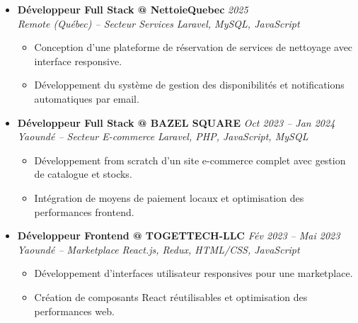 \documentclass[a4paper,11pt]{article}
\begin{document}
\begin{itemize}[leftmargin=*, label={-}]
\item \textbf{Développeur Full Stack @ NettoieQuebec} \hfill \textit{2025} \\
\textit{Remote (Québec) -- Secteur Services} \hfill \textit{Laravel, MySQL, JavaScript}
\vspace{-2pt}
    \begin{itemize}[leftmargin=0.4cm, nosep, label=\tiny$\bullet$]
        \item \small{Conception d'une plateforme de réservation de services de nettoyage avec interface responsive.}
        \item \small{Développement du système de gestion des disponibilités et notifications automatiques par email.}
    \end{itemize}
\vspace{3pt}

\item \textbf{Développeur Full Stack @ BAZEL SQUARE} \hfill \textit{Oct 2023 -- Jan 2024} \\
\textit{Yaoundé -- Secteur E-commerce} \hfill \textit{Laravel, PHP, JavaScript, MySQL}
\vspace{-2pt}
    \begin{itemize}[leftmargin=0.4cm, nosep, label=\tiny$\bullet$]
        \item \small{Développement from scratch d'un site e-commerce complet avec gestion de catalogue et stocks.}
        \item \small{Intégration de moyens de paiement locaux et optimisation des performances frontend.}
    \end{itemize}
\vspace{3pt}

\item \textbf{Développeur Frontend @ TOGETTECH-LLC} \hfill \textit{Fév 2023 -- Mai 2023} \\
\textit{Yaoundé -- Marketplace} \hfill \textit{React.js, Redux, HTML/CSS, JavaScript}
\vspace{-2pt}
    \begin{itemize}[leftmargin=0.4cm, nosep, label=\tiny$\bullet$]
        \item \small{Développement d'interfaces utilisateur responsives pour une marketplace.}
        \item \small{Création de composants React réutilisables et optimisation des performances web.}
    \end{itemize}
\vspace{3pt}

\end{itemize}
\end{document}
